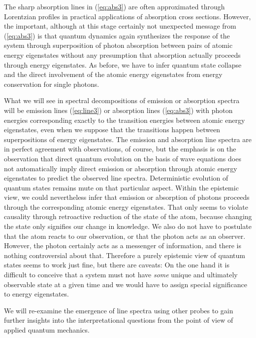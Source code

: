 \documentclass[final,3p,12pt]{elsarticle3}
\begin{document}
The sharp absorption lines in (\ref{eq:abs3}) are often approximated 
through Lorentzian profiles in practical applications of absorption
cross sections.
However, the important, although at this stage certainly not unexpected
message from (\ref{eq:abs3}) is that quantum dynamics again synthesizes
the response of the system through superposition of photon absorption
between pairs of atomic energy eigenstates without any presumption that 
absorption actually proceeds through energy eigenstates. As before, we 
have to infer quantum state collapse and the direct involvement of the 
atomic energy eigenstates from energy conservation for single photons.

What we will see in spectral decompositions of emission or absorption
spectra will be emission lines (\ref{eq:line3}) or absorption lines
(\ref{eq:abs3}) with photon energies corresponding exactly to the
transition energies between atomic energy eigenstates, even when we
suppose that the transitions happen between superpositions of energy 
eigenstates. The emission and absorption line spectra are in perfect 
agreement with observations, of course, but the emphasis is on the 
observation that direct quantum evolution on the basis of wave equations 
does not automatically imply direct emission or absorption through atomic 
energy eigenstates to predict the observed line spectra. Deterministic
evolution of quantum states remains mute on that particular aspect.
Within the epistemic view, we could nevertheless infer that emission
or absorption of photons proceeds through the corresponding atomic
energy eigenstates. That only seems to violate causality
through retroactive reduction of the state of the atom,
because changing the state only signifies our change in knowledge.
We also do not have to postulate that the atom reacts to our observation,
or that the photon acts as an observer. However, the photon certainly acts
as a messenger of information, and there is nothing controversial about 
that. Therefore a purely epistemic view of quantum states seems to work 
just fine, but there are caveats: On the one hand it is difficult to conceive 
that a system must not have {\it some} unique and ultimately observable
state at a given time and we would have to assign special 
significance to energy eigenstates.

We will re-examine the emergence of line spectra using other probes to gain
 further insights into the interpretational questions from the point of view 
of applied quantum mechanics.

\end{document}
